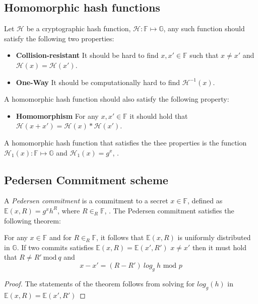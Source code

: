 \subsection*{Homomorphic hash functions}
Let $\mathcal{H}$ be a cryptographic hash function, $\mathcal{H}:\mathds{F}\mapsto \mathds{G}$, any such function should satisfy the following two properties:
\begin{itemize}
    \item \textbf{Collision-resistant} It should be hard to find $x,x'\in\mathds{F}$ such that $x\neq x'$ and $\mathcal{H}(x)=\mathcal{H}(x')$.
    \item \textbf{One-Way} It should be computationally hard to find $\mathcal{H}^{-1}(x)$.
\end{itemize}

A homomorphic hash function should also satisfy the following property:
\begin{itemize}
    \item \textbf{Homomorphism} For any $x,x'\in\mathds{F}$ it should hold that $\mathcal{H}(x + x') = \mathcal{H}(x)*\mathcal{H}(x')$.
\end{itemize}

A homomorphic hash function that satisfies the thee properties is the function $\mathcal{H}_1(x):\mathds{F}\mapsto\mathds{G}$ and $\mathcal{H}_1(x)= g^{x}$, \cite{HHF}. 



\subsection*{Pedersen Commitment scheme}
A \textit{Pedersen commitment} is a commitment to a secret $x\in\mathds{F}$, defined as $\mathds{E}(x,R)=g^xh^R$, where $R\in_R\mathds{F}$, \cite{pedersen}. The Pedersen commitment satisfies the following theorem:
\\
\begin{thm}
\label{thm:C=g^xh^R}
For any $x\in\mathds{F}$ and for $R\in_R\mathds{F}$, it follows that   $\mathds{E}(x,R)$ is uniformly distributed in $\mathds{G}$. If two commits satisfies $\mathds{E}(x,R)=\mathds{E}(x',R')$  $x\neq x'$ then it must hold that $R\neq R' \:\text{mod}\:q$ and 
\begin{equation}
\label{eq:pedersen_binidng}
   x-x' =  (R-R')\:log_g\:h \text{ mod }p 
\end{equation}
\end{thm}
\begin{proof}
The statements of the theorem follows from solving for $log_g(h)$ in $\mathds{E}(x,R)=\mathds{E}(x',R')$ 
\end{proof}

